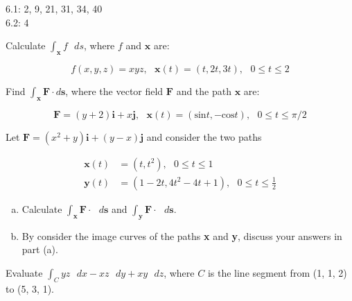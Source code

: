 \documentclass[11pt,letterpaper,boxed]{pset}
\begin{document}
    \begin{center}
    	6.1: 2, 9, 21, 31, 34, 40 \\
    	6.2: 4
    \end{center}
    
    \begin{problem} [6.1.2]
    	Calculate $\int_\textbf{x} f \textrm{ } ds$, where $f$ and $\textbf{x}$ are:
    
    	\[f(x,y,z)=xyz,\textrm{ } \textbf{x}(t) = (t, 2t, 3t), \textrm{ } 0 \leq t \leq 2\]
    
    \end{problem}
    \newpage
    
    
    \begin{problem} [6.1.9]
    	Find $\int_\textbf{x} \textbf{F} \cdot d\textbf{s}$, where the vector field $\textbf{F}$ and the path $\textbf{x}$ are:
    
    	\[\textbf{F} = (y+2)\textbf{i} + x\textbf{j}, \textrm{ } \textbf{x}(t) = 
    		(\textrm{sin}t, -\textrm{cos}t), \textrm{ } 0 \leq t \leq \pi / 2\]
    
    \end{problem}
    \newpage
    
    
    \begin{problem} [6.1.21]
    	Let $\textbf{F} = (x^2 + y)\textbf{i} + (y - x)\textbf{j}$ and consider the two paths
    	
    	\begin{align*}
    	    \textbf{x}(t) &= (t,t^2), \textrm{ } 0 \leq t \leq 1 \\
    	    \textbf{y}(t) &= (1-2t, 4t^2-4t+1), \textrm{ } 0 \leq t \leq \frac12
    	\end{align*}
    
        \begin{enumerate} [(a)]
            \item Calculate $\int_\textbf{x} \textbf{F} \cdot \textrm{ } d\textbf{s}$ and $\int_\textbf{y} \textbf{F} \cdot \textrm{ } d\textbf{s}$.
    		\item By consider the image curves of the paths \textbf{x} and \textbf{y}, discuss your answers in part (a).
        \end{enumerate}
    	
    \end{problem}
    \newpage
    
    
    \begin{problem} [6.1.31]
    	Evaluate $\int_C yz\textrm{ } dx - xz\textrm{ }dy + xy\textrm{ }dz$, where $C$ is the line segment from (1, 1, 2) to (5, 3, 1).
    \end{problem}
    \newpage
    
\end{document}
